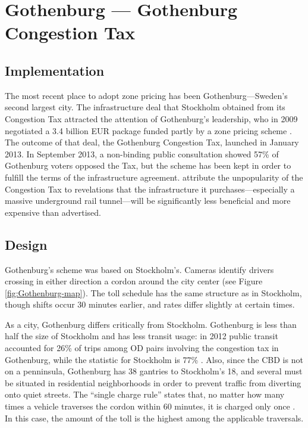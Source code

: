 
\section{Gothenburg --- Gothenburg Congestion Tax}

\subsection{Implementation}

The most recent place to adopt zone pricing has been Gothenburg---Sweden's second largest city. The infrastructure deal that Stockholm obtained from its Congestion Tax attracted the attention of Gothenburg's leadership, who in 2009 negotiated a 3.4 billion EUR package funded partly by a zone pricing scheme \citep{Borjesson2015}. The outcome of that deal, the Gothenburg Congestion Tax, launched in January 2013. In September 2013, a non-binding public consultation showed 57\% of Gothenburg voters opposed the Tax, but the scheme has been kept in order to fulfill the terms of the infrastructure agreement. \citet{Borjesson2015} attribute the unpopularity of the Congestion Tax to revelations that the infrastructure it purchases---especially a massive underground rail tunnel---will be significantly less beneficial and more expensive than  advertised. 

\subsection{Design}

Gothenburg's scheme was based on Stockholm's. Cameras identify drivers crossing in either direction a cordon around the city center (see Figure \ref{fig:Gothenburg-map}). The toll schedule has the same structure as in Stockholm, though shifts occur 30 minutes earlier, and rates differ slightly at certain times. 

As a city, Gothenburg differs critically from Stockholm. Gothenburg is less than half the size of Stockholm and has less transit usage: in 2012 public transit accounted for 26\% of trips among OD pairs involving the congestion tax in Gothenburg, while the statistic for Stockholm is 77\% \citep{Borjesson2015}. Also, since the CBD is not on a penninsula, Gothenburg has 38 gantries to Stockholm's 18, and several must be situated in residential neighborhoods in order to prevent traffic from diverting onto quiet streets. The ``single charge rule'' states that, no matter how many times a vehicle traverses the cordon within 60 minutes, it is charged only once \citep{transportstyrelsen2015}. In this case, the amount of the toll is the highest among the applicable traversals.

